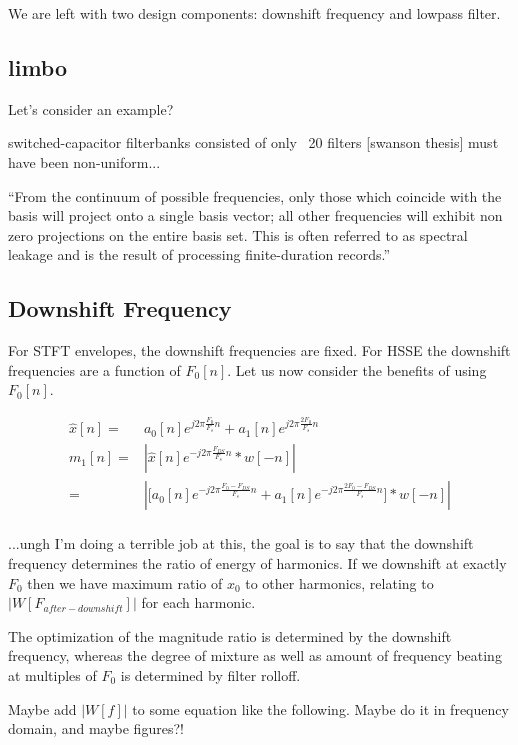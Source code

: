 \documentclass [11pt, proquest] {uwthesis}[2015/03/03]
\begin{document}
We are left with two design components: downshift frequency and lowpass filter.

\subsection{limbo}

Let's consider an example?

switched-capacitor filterbanks consisted of only ~20 filters [swanson thesis] must have been non-uniform...



``From the continuum of possible frequencies, only those which coincide with the basis will project onto a single basis vector; all other frequencies will exhibit non zero projections on the entire basis set. This is often referred to as spectral leakage and is the result of processing finite-duration records.''

\subsection{Downshift Frequency}


For STFT envelopes, the downshift frequencies are fixed.  For HSSE the downshift frequencies are a function of $F_0[n]$.  Let us now consider the benefits of using $F_0[n]$.


\begin{align}
\widehat{x}[n] =& a_0[n] e^{j2\pi \frac{F_0}{F_s} n} + a_1[n] e^{j2\pi \frac{2F_0}{F_s} n} \\
m_1[n] =& | \widehat{x}[n] e^{-j2\pi \frac{F_{DS}}{F_s} n} * w[-n] | \\
=& | \Big[ a_0[n] e^{-j2\pi \frac{F_0 - F_{DS}}{F_s} n} + a_1[n] e^{-j2\pi \frac{2F_0 - F_{DS}}{F_s} n} \Big] * w[-n] | \\
\end{align}

...ungh I'm doing a terrible job at this, the goal is to say that the downshift frequency determines the ratio of energy of harmonics.  If we downshift at exactly $F_0$ then we have maximum ratio of $x_0$ to other harmonics, relating to $|W[F_{after-downshift}]|$ for each harmonic.

The optimization of the magnitude ratio is determined by the downshift frequency, whereas the degree of mixture as well as amount of frequency beating at multiples of $F_0$ is determined by filter rolloff.

Maybe add $|W[f]|$ to some equation like the following.  Maybe do it in frequency domain, and maybe figures?!
\end{document}

